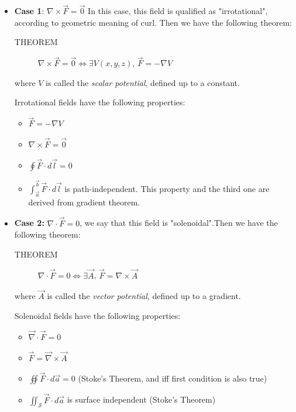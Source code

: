 \documentclass[12pt,a4paper,twoside]{article}
\begin{document}
    \begin{itemize}
        \item \textbf{Case 1}: \(\nabla\times \overrightarrow{F}=\overrightarrow{0}\)
        In this case, this field is qualified as "irrotational", according to geometric meaning of curl. Then we have the following theorem:
        \begin{description}
	        \item[THEOREM] $\nabla\times\overrightarrow{F} = \overrightarrow{0}\iff \exists V(x,y,z)$, $\overrightarrow{F}=-\nabla V$
        \end{description}
        where $V$ is called the \textit{scalar potential}, defined up to a constant.
        
        Irrotational fields have the following properties:
        \begin{itemize}
            \item \(\overrightarrow{F}=-\nabla V\)
            \item \(\nabla \times \overrightarrow{F}=\overrightarrow{0}\) 
            \item \(\oint \overrightarrow{F}\cdot d\overrightarrow{l}=0\)
            \item \(\int_{\overrightarrow{a}}^{\overrightarrow{b}}\overrightarrow{F}\cdot d\overrightarrow{l}\) is path-independent. This property and the third one are derived from gradient theorem.
        \end{itemize}
        
        \item \textbf{Case 2:} \(\nabla\cdot \overrightarrow{F}=0\), we say that this field is "solenoidal".Then we have the following theorem:
        \begin{description}
	        \item[THEOREM] $\nabla\cdot\overrightarrow{F} = 0\iff \exists\overrightarrow{A}$, $\overrightarrow{F}=\nabla\times\overrightarrow{A}$
        \end{description}
        where $\overrightarrow{A}$ is called the \textit{vector potential}, defined up to a gradient.
        
        Solenoidal fields have the following properties:
        \begin{itemize}
            \item \(\overrightarrow{\nabla}\cdot\overrightarrow{F}=0\)
            \item \(\overrightarrow{F}=\overrightarrow{\nabla}\times\overrightarrow{A}\)
            \item \(\oiint \overrightarrow{F}\cdot d\overrightarrow{a}=0\) (Stoke's Theorem, and iff first condition is also true)
            \item \(\iint_\mathcal{S}\overrightarrow{F}\cdot d\overrightarrow{a}\) is surface independent (Stoke's Theorem)
        \end{itemize}
    \end{itemize}
	
\end{document}
